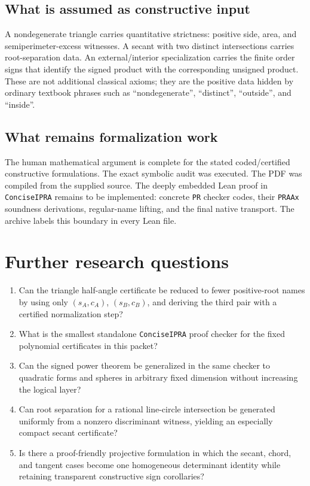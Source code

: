 \documentclass[11pt,letterpaper]{article}
\theoremstyle{definition}
\theoremstyle{remark}
\newcommand{\code}[1]{\texttt{#1}}
\begin{document}
\subsection{What is assumed as constructive input}

A nondegenerate triangle carries quantitative strictness: positive side,
area, and semiperimeter-excess witnesses.  A secant with two distinct
intersections carries root-separation data.  An external/interior
specialization carries the finite order signs that identify the signed product
with the corresponding unsigned product.  These are not additional classical
axioms; they are the positive data hidden by ordinary textbook phrases such as
``nondegenerate'', ``distinct'', ``outside'', and ``inside''.

\subsection{What remains formalization work}

The human mathematical argument is complete for the stated coded/certified
constructive formulations.  The exact symbolic audit was executed.  The PDF
was compiled from the supplied source.  The deeply embedded Lean proof in
\texttt{ConciseIPRA} remains to be implemented: concrete \code{PR} checker
codes, their \code{PRAAx} soundness derivations, regular-name lifting, and the
final native transport.  The archive labels this boundary in every Lean file.

\section{Further research questions}

\begin{enumerate}
\item Can the triangle half-angle certificate be reduced to fewer positive-root
names by using only \((s_A,c_A)\), \((s_B,c_B)\), and deriving the third pair
with a certified normalization step?
\item What is the smallest standalone \texttt{ConciseIPRA} proof checker for
the fixed polynomial certificates in this packet?
\item Can the signed power theorem be generalized in the same checker to
quadratic forms and spheres in arbitrary fixed dimension without increasing the
logical layer?
\item Can root separation for a rational line-circle intersection be generated
uniformly from a nonzero discriminant witness, yielding an especially compact
secant certificate?
\item Is there a proof-friendly projective formulation in which the secant,
chord, and tangent cases become one homogeneous determinant identity while
retaining transparent constructive sign corollaries?
\end{enumerate}
\end{document}
